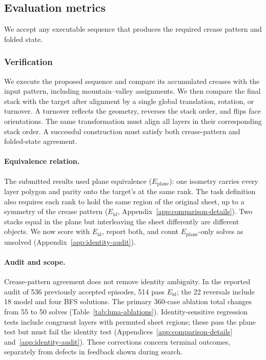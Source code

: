 \subsection{Evaluation metrics}
\label{sec:scoring}

\label{sec:scoring-why}
We accept any executable sequence that produces the required crease pattern and folded state.

\subsubsection{Verification}
\label{sec:scoring-what}

We execute the proposed sequence and compare its accumulated creases with the input pattern,
including mountain--valley assignments. We then compare the final stack with the target after
alignment by a single global translation, rotation, or turnover. A turnover reflects the geometry,
reverses the stack order, and flips face orientations. The same transformation must align all
layers in their corresponding stack order.
A successful construction must satisfy both crease-pattern and folded-state agreement.

\paragraph{Equivalence relation.} The submitted results used plane equivalence
($E_{\mathrm{plane}}$): one isometry carries every layer polygon and parity onto the target's at
the same rank. The task definition also requires each rank to hold the same region of the
original sheet, up to a symmetry of the crease pattern ($E_{\mathrm{id}}$,
Appendix~\ref{app:comparison-details}). Two stacks equal in the plane but interleaving the sheet
differently are different objects. We now score with $E_{\mathrm{id}}$, report both, and count
$E_{\mathrm{plane}}$-only solves as unsolved (Appendix~\ref{app:identity-audit}).

\paragraph{Audit and scope.}
Crease-pattern agreement does not remove identity ambiguity. In the reported audit of
536 previously accepted episodes, 514 pass $E_{\mathrm{id}}$; the 22 reversals include
18 model and four BFS solutions. The primary 360-case ablation total changes from
55 to 50 solves (Table~\ref{tab:luna-ablations}). Identity-sensitive regression tests
include congruent layers with permuted sheet regions; these pass the plane test but
must fail the identity test (Appendices~\ref{app:comparison-details}
and~\ref{app:identity-audit}). These corrections concern terminal outcomes, separately
from defects in feedback shown during search.

